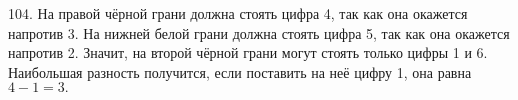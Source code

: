 104. На правой чёрной грани должна стоять цифра 4, так как она окажется напротив 3. На нижней белой грани должна стоять цифра 5, так как она окажется напротив 2. Значит, на второй чёрной грани могут стоять только цифры 1 и 6. Наибольшая разность получится, если поставить на неё цифру 1, она равна $4-1=3.$\\
